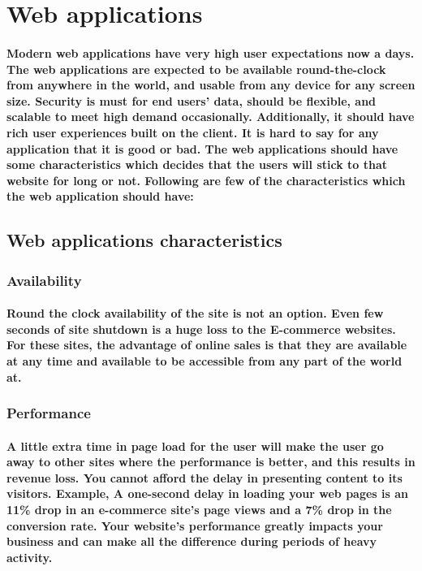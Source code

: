 \documentclass[12pt,a4paper]{article}
\begin{document}
	
	
	\section{Web applications}

    \paragraph{Modern web applications have very high user expectations now a days. The web applications are expected to be available round-the-clock from anywhere in the world, and usable from any device for any screen size. Security is must for end users’ data, should be flexible, and scalable to meet high demand occasionally. Additionally, it should have rich user experiences built on the client.
    It is hard to say for any application that it is good or bad. The web applications should have some characteristics which decides that the users will stick to that website for long or not. Following are few of the characteristics which the web application should have:
    }
    
    \subsection{Web applications characteristics}
    
    \subsubsection{Availability}

    \paragraph{Round the clock availability of the site is not an option. Even few seconds of site shutdown is a huge loss to the E-commerce websites. For these sites, the advantage of online sales is that they are available at any time and available to be accessible from any part of the world at. 
    }
    
    \subsubsection{Performance}

    \paragraph{A little extra time in page load for the user will make the user go away to other sites where the performance is better, and this results in revenue loss. You cannot afford the delay in presenting content to its visitors. Example, A one-second delay in loading your web pages is an 11\% drop in an e-commerce site’s page views and a 7\% drop in the conversion rate. Your website’s performance greatly impacts your business and can make all the difference during periods of heavy activity. 
    }
    
\end{document}
